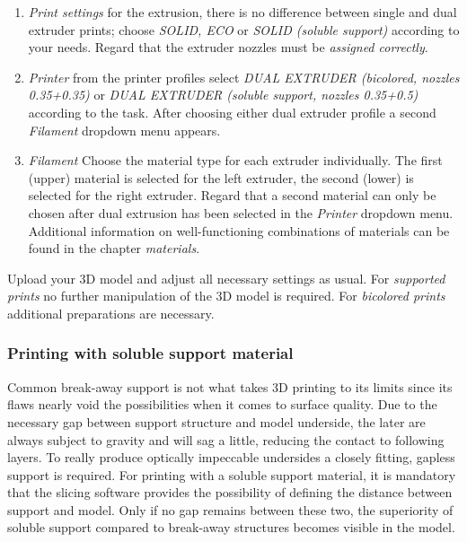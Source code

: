 \begin{enumerate}
  \item \emph{Print settings} \newline
    for the extrusion, there is no difference between single and dual extruder prints; choose \emph{SOLID, ECO} or \emph{SOLID (soluble support)}
    according to your needs. \newline
    Regard that the extruder nozzles must be \emph{assigned correctly}.

  \item \emph{Printer} \newline
    from the printer profiles select
    \emph{DUAL EXTRUDER (bicolored, nozzles 0.35+0.35)} \newline
    or
    \emph{DUAL EXTRUDER (soluble support, nozzles 0.35+0.5)} 
    according to the task. \newline
    After choosing either dual extruder profile a second \emph{Filament} dropdown menu appears.

  \item \emph{Filament}
    Choose the material type for each extruder individually. The first (upper) material is selected for the left extruder, 
    the second (lower) is selected for the right extruder. \newline
    Regard that a second material can only be chosen after dual extrusion has been selected in the \emph{Printer} dropdown menu. \newline
    Additional information on well-functioning combinations of materials can be found in the chapter \emph{materials}.
\end{enumerate}

Upload your 3D model and adjust all necessary settings as usual.
For \emph{supported prints} no further manipulation of the 3D model is required.
For \emph{bicolored prints} additional preparations are necessary. 

\subsubsection{Printing with soluble support material}

Common break-away support is not what takes 3D printing to its limits since its flaws nearly void the possibilities when it comes to surface quality. Due to the necessary gap between support structure and model underside, the later are always subject to gravity and will sag a little, reducing the contact to following layers. To really produce optically impeccable undersides a closely fitting, gapless support is required.
For printing with a soluble support material, it is mandatory that the slicing software provides the possibility of defining the distance between support and model. Only if no gap remains between these two, the superiority of soluble support compared to break-away structures becomes visible in the model.

